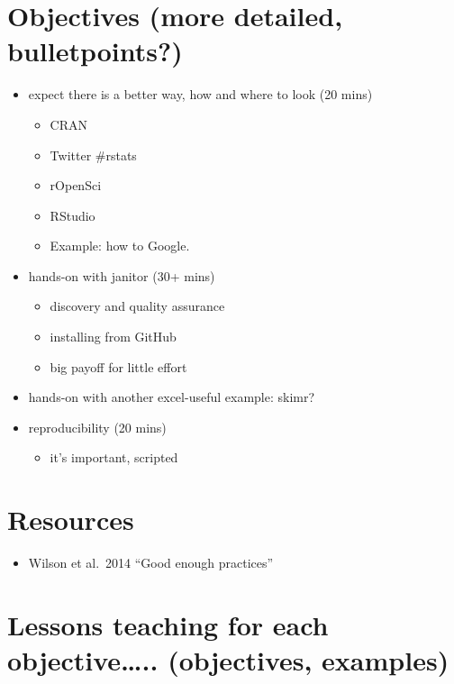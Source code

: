 \documentclass[]{book}
\providecommand{\tightlist}{%
  \setlength{\itemsep}{0pt}\setlength{\parskip}{0pt}}
\begin{document}
\hypertarget{objectives-more-detailed-bulletpoints-5}{%
\section{Objectives (more detailed, bulletpoints?)}\label{objectives-more-detailed-bulletpoints-5}}

\begin{itemize}
\tightlist
\item
  expect there is a better way, how and where to look (20 mins)

  \begin{itemize}
  \tightlist
  \item
    CRAN
  \item
    Twitter \#rstats
  \item
    rOpenSci
  \item
    RStudio
  \item
    Example: how to Google.
  \end{itemize}
\item
  hands-on with janitor (30+ mins)

  \begin{itemize}
  \tightlist
  \item
    discovery and quality assurance
  \item
    installing from GitHub
  \item
    big payoff for little effort
  \end{itemize}
\item
  hands-on with another excel-useful example: skimr?\\
\item
  reproducibility (20 mins)

  \begin{itemize}
  \tightlist
  \item
    it's important, scripted
  \end{itemize}
\end{itemize}

\hypertarget{resources-5}{%
\section{Resources}\label{resources-5}}

\begin{itemize}
\tightlist
\item
  Wilson et al.~2014 ``Good enough practices''
\end{itemize}

\hypertarget{lessons-teaching-for-each-objective..-objectives-examples-4}{%
\section{Lessons teaching for each objective\ldots{}.. (objectives, examples)}\label{lessons-teaching-for-each-objective..-objectives-examples-4}}
\end{document}
